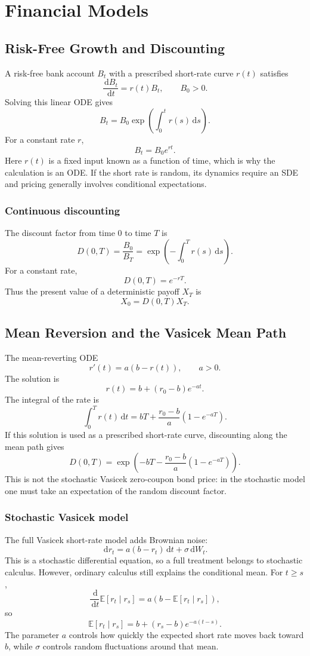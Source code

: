 \documentclass[11pt]{article}
\newcommand{\E}{\mathbb{E}}
\newcommand{\dd}{\,\mathrm{d}}
\theoremstyle{definition}
\theoremstyle{plain}
\theoremstyle{remark}
\begin{document}
\section{Financial Models}

\subsection{Risk-Free Growth and Discounting}

A risk-free bank account $B_t$ with a prescribed short-rate curve $r(t)$ satisfies
\[
\frac{\dd B_t}{\dd t}=r(t)B_t,
\qquad B_0>0.
\]
Solving this linear ODE gives
\[
B_t=B_0\exp\left(\int_0^t r(s)\dd s\right).
\]
For a constant rate $r$,
\[
B_t=B_0e^{rt}.
\]
Here $r(t)$ is a fixed input known as a function of time, which is why the
calculation is an ODE. If the short rate is random, its dynamics require an
SDE and pricing generally involves conditional expectations.

\subsubsection*{Continuous discounting}

The discount factor from time $0$ to time $T$ is
\[
D(0,T)=\frac{B_0}{B_T}
=\exp\left(-\int_0^T r(s)\dd s\right).
\]
For a constant rate,
\[
D(0,T)=e^{-rT}.
\]
Thus the present value of a deterministic payoff $X_T$ is
\[
X_0=D(0,T)X_T.
\]

\subsection{Mean Reversion and the Vasicek Mean Path}

The mean-reverting ODE
\[
r'(t)=a(b-r(t)),
\qquad a>0.
\]
The solution is
\[
r(t)=b+(r_0-b)e^{-at}.
\]
The integral of the rate is
\[
\int_0^T r(t)\dd t
=
bT+\frac{r_0-b}{a}(1-e^{-aT}).
\]
If this solution is used as a prescribed short-rate curve, discounting along
the mean path gives
\[
D(0,T)=
\exp\left(
-bT-\frac{r_0-b}{a}(1-e^{-aT})
\right).
\]
This is not the stochastic Vasicek zero-coupon bond price: in the stochastic
model one must take an expectation of the random discount factor.

\subsubsection*{Stochastic Vasicek model}

The full Vasicek short-rate model adds Brownian noise:
\[
\dd r_t=a(b-r_t)\dd t+\sigma\dd W_t.
\]
This is a stochastic differential equation, so a full treatment belongs to
stochastic calculus. However, ordinary calculus still explains the conditional
mean. For $t\ge s$,
\[
\frac{\dd}{\dd t}\E[r_t\mid r_s]
=a\left(b-\E[r_t\mid r_s]\right),
\]
so
\[
\E[r_t\mid r_s]
=b+(r_s-b)e^{-a(t-s)}.
\]
The parameter $a$ controls how quickly the expected short rate moves back
toward $b$, while $\sigma$ controls random fluctuations around that mean.
\end{document}
